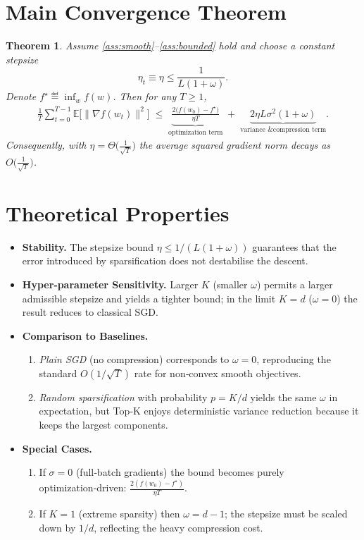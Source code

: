 \documentclass{article}
\newtheorem{theorem}{Theorem}
\newcommand{\E}{\mathbb{E}}
\begin{document}
\section*{Main Convergence Theorem}
\begin{theorem}
\label{thm:main}
Assume \ref{ass:smooth}–\ref{ass:bounded} hold and choose a constant stepsize
\[
\eta_t\equiv\eta\le\frac{1}{L(1+\omega)}.
\]
Denote $f^{\star}\eqdef\inf_{w}f(w)$. Then for any $T\ge1$,
\begin{align}
\frac{1}{T}\sum_{t=0}^{T-1}\E\!\big[\|\nabla f(w_t)\|^{2}\big]
\;\le\;
\underbrace{\frac{2\big(f(w_0)-f^{\star}\big)}{\eta T}}_{\text{optimization term}}
\;+\;
\underbrace{2\eta L\sigma^{2}(1+\omega)}_{\text{variance \& compression term}}.
\tag{Theorem 1}
\end{align}
Consequently, with $\eta = \Theta\!\big(\tfrac{1}{\sqrt{T}}\big)$ the average squared gradient norm decays as $O\!\big(\tfrac{1}{\sqrt{T}}\big)$.
\end{theorem}

\section*{Theoretical Properties}
\begin{itemize}[leftmargin=*,labelsep=5mm]
\item \textbf{Stability.} The stepsize bound $\eta\le 1/(L(1+\omega))$ guarantees that the error introduced by sparsification does not destabilise the descent.
\item \textbf{Hyper‑parameter Sensitivity.} Larger $K$ (smaller $\omega$) permits a larger admissible stepsize and yields a tighter bound; in the limit $K=d$ ($\omega=0$) the result reduces to classical SGD.
\item \textbf{Comparison to Baselines.}
    \begin{enumerate}
        \item \emph{Plain SGD} (no compression) corresponds to $\omega=0$, reproducing the standard $O(1/\sqrt{T})$ rate for non‑convex smooth objectives.
        \item \emph{Random sparsification} with probability $p=K/d$ yields the same $\omega$ in expectation, but Top‑K enjoys deterministic variance reduction because it keeps the largest components.
    \end{enumerate}
\item \textbf{Special Cases.}
    \begin{enumerate}
        \item If $\sigma=0$ (full‑batch gradients) the bound becomes purely optimization‑driven: $\frac{2(f(w_0)-f^{\star})}{\eta T}$.
        \item If $K=1$ (extreme sparsity) then $\omega = d-1$; the stepsize must be scaled down by $1/d$, reflecting the heavy compression cost.
    \end{enumerate}
\end{itemize}
\end{document}
